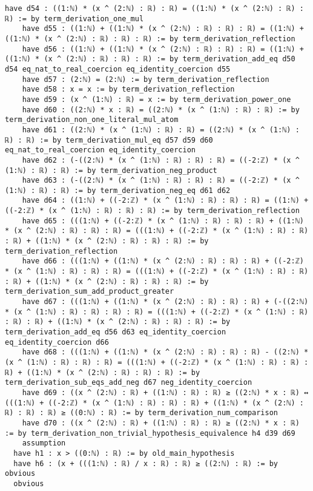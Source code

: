 \documentclass{article}
\begin{document}
\begin{tcolorbox}[colback=white!10, width=\linewidth]
\begin{lstlisting}[language=Lean4]
    have d54 : ((1:ℕ) * (x ^ (2:ℕ) : ℝ) : ℝ) = ((1:ℕ) * (x ^ (2:ℕ) : ℝ) : ℝ) := by term_derivation_one_mul
    have d55 : ((1:ℕ) + ((1:ℕ) * (x ^ (2:ℕ) : ℝ) : ℝ) : ℝ) = ((1:ℕ) + ((1:ℕ) * (x ^ (2:ℕ) : ℝ) : ℝ) : ℝ) := by term_derivation_reflection
    have d56 : ((1:ℕ) + ((1:ℕ) * (x ^ (2:ℕ) : ℝ) : ℝ) : ℝ) = ((1:ℕ) + ((1:ℕ) * (x ^ (2:ℕ) : ℝ) : ℝ) : ℝ) := by term_derivation_add_eq d50 d54 eq_nat_to_real_coercion eq_identity_coercion d55
    have d57 : (2:ℕ) = (2:ℕ) := by term_derivation_reflection
    have d58 : x = x := by term_derivation_reflection
    have d59 : (x ^ (1:ℕ) : ℝ) = x := by term_derivation_power_one
    have d60 : ((2:ℕ) * x : ℝ) = ((2:ℕ) * (x ^ (1:ℕ) : ℝ) : ℝ) := by term_derivation_non_one_literal_mul_atom
    have d61 : ((2:ℕ) * (x ^ (1:ℕ) : ℝ) : ℝ) = ((2:ℕ) * (x ^ (1:ℕ) : ℝ) : ℝ) := by term_derivation_mul_eq d57 d59 d60 eq_nat_to_real_coercion eq_identity_coercion
    have d62 : (-((2:ℕ) * (x ^ (1:ℕ) : ℝ) : ℝ) : ℝ) = ((-2:ℤ) * (x ^ (1:ℕ) : ℝ) : ℝ) := by term_derivation_neg_product
    have d63 : (-((2:ℕ) * (x ^ (1:ℕ) : ℝ) : ℝ) : ℝ) = ((-2:ℤ) * (x ^ (1:ℕ) : ℝ) : ℝ) := by term_derivation_neg_eq d61 d62
    have d64 : ((1:ℕ) + ((-2:ℤ) * (x ^ (1:ℕ) : ℝ) : ℝ) : ℝ) = ((1:ℕ) + ((-2:ℤ) * (x ^ (1:ℕ) : ℝ) : ℝ) : ℝ) := by term_derivation_reflection
    have d65 : (((1:ℕ) + ((-2:ℤ) * (x ^ (1:ℕ) : ℝ) : ℝ) : ℝ) + ((1:ℕ) * (x ^ (2:ℕ) : ℝ) : ℝ) : ℝ) = (((1:ℕ) + ((-2:ℤ) * (x ^ (1:ℕ) : ℝ) : ℝ) : ℝ) + ((1:ℕ) * (x ^ (2:ℕ) : ℝ) : ℝ) : ℝ) := by term_derivation_reflection
    have d66 : (((1:ℕ) + ((1:ℕ) * (x ^ (2:ℕ) : ℝ) : ℝ) : ℝ) + ((-2:ℤ) * (x ^ (1:ℕ) : ℝ) : ℝ) : ℝ) = (((1:ℕ) + ((-2:ℤ) * (x ^ (1:ℕ) : ℝ) : ℝ) : ℝ) + ((1:ℕ) * (x ^ (2:ℕ) : ℝ) : ℝ) : ℝ) := by term_derivation_sum_add_product_greater
    have d67 : (((1:ℕ) + ((1:ℕ) * (x ^ (2:ℕ) : ℝ) : ℝ) : ℝ) + (-((2:ℕ) * (x ^ (1:ℕ) : ℝ) : ℝ) : ℝ) : ℝ) = (((1:ℕ) + ((-2:ℤ) * (x ^ (1:ℕ) : ℝ) : ℝ) : ℝ) + ((1:ℕ) * (x ^ (2:ℕ) : ℝ) : ℝ) : ℝ) := by term_derivation_add_eq d56 d63 eq_identity_coercion eq_identity_coercion d66
    have d68 : (((1:ℕ) + ((1:ℕ) * (x ^ (2:ℕ) : ℝ) : ℝ) : ℝ) - ((2:ℕ) * (x ^ (1:ℕ) : ℝ) : ℝ) : ℝ) = (((1:ℕ) + ((-2:ℤ) * (x ^ (1:ℕ) : ℝ) : ℝ) : ℝ) + ((1:ℕ) * (x ^ (2:ℕ) : ℝ) : ℝ) : ℝ) := by term_derivation_sub_eqs_add_neg d67 neg_identity_coercion
    have d69 : ((x ^ (2:ℕ) : ℝ) + ((1:ℕ) : ℝ) : ℝ) ≥ ((2:ℕ) * x : ℝ) ↔ (((1:ℕ) + ((-2:ℤ) * (x ^ (1:ℕ) : ℝ) : ℝ) : ℝ) + ((1:ℕ) * (x ^ (2:ℕ) : ℝ) : ℝ) : ℝ) ≥ ((0:ℕ) : ℝ) := by term_derivation_num_comparison
    have d70 : ((x ^ (2:ℕ) : ℝ) + ((1:ℕ) : ℝ) : ℝ) ≥ ((2:ℕ) * x : ℝ) := by term_derivation_non_trivial_hypothesis_equivalence h4 d39 d69
    assumption
  have h1 : x > ((0:ℕ) : ℝ) := by old_main_hypothesis
  have h6 : (x + (((1:ℕ) : ℝ) / x : ℝ) : ℝ) ≥ ((2:ℕ) : ℝ) := by obvious
  obvious

\end{lstlisting}
\end{tcolorbox}
\end{document}
